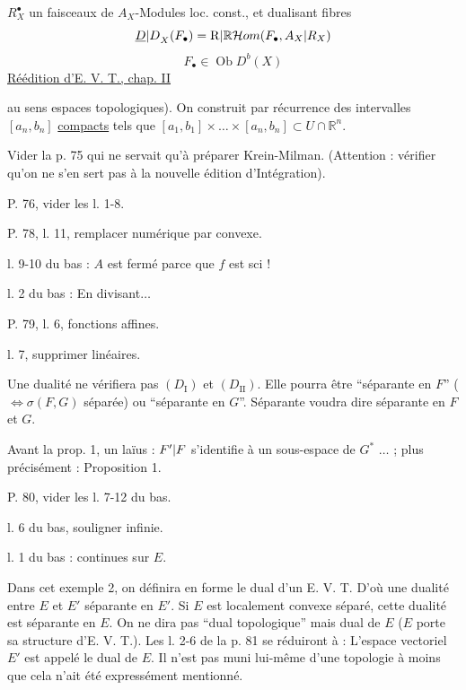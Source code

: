 $R_X^{\bullet}$ un  faisceaux de $A_X$-Modules loc. const., et dualisant  fibres 
\[
{\underline{D}|D}_X(F_\bullet)={\mathrm{R}|\mathbb{R}}\mathcal{H}om(F_\bullet,{A_X|R_X})
\]
\[
F_\bullet\in\operatorname{Ob}D^b(X)
\]
\uline{Réédition d'E. V. T., chap. II} 

au sens espaces topologiques). On construit par récurrence des intervalles $[a_n,b_n]$ \uline{compacts} tels que $[a_1,b_1]\times\ldots\times[a_n,b_n]\subset U\cap\mathbb{R}^n$.

Vider la p. 75 qui ne servait qu'à préparer Krein-Milman. (Attention : vérifier qu'on ne s'en sert pas à la nouvelle édition d'Intégration).

P. 76, vider les l. 1-8.

P. 78, l. 11, remplacer numérique par convexe.

l. 9-10 du bas : $A$ est fermé parce que $f$ est sci !

l. 2 du bas : En divisant$\ldots$

P. 79, l. 6, fonctions affines.

l. 7, supprimer linéaires.

Une dualité ne vérifiera pas $(D_{\mathrm{I}})$ et $(D_{\mathrm{II}})$. Elle pourra être ``séparante en $F$'' ($\Longleftrightarrow\sigma(F,G)$ séparée) ou ``séparante en $G$''. Séparante voudra dire séparante en $F$ et $G$.

Avant la prop. 1, un laïus : ${F'|F}$ s'identifie à un sous-espace de $G^*$ $\ldots$ ; plus précisément : Proposition 1.

P. 80, vider les l. 7-12 du bas.

l. 6 du bas, souligner infinie.

l. 1 du bas : continues sur $E$.

Dans cet exemple 2, on définira en forme le dual d'un E. V. T. D'où une dualité entre $E$ et $E'$ séparante en $E'$. Si $E$ est localement convexe séparé, cette dualité est séparante en $E$. On ne dira pas ``dual topologique'' mais dual de $E$ ($E$ porte sa structure d'E. V. T.). Les l. 2-6 de la p. 81 se réduiront à : L'espace vectoriel $E'$ est appelé le dual de $E$. Il n'est pas muni lui-même d'une topologie à moins que cela n'ait été expressément mentionné.

